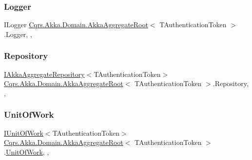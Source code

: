 \subsubsection{\texorpdfstring{Logger}{Logger}}
{\footnotesize\ttfamily I\+Logger \hyperlink{classCqrs_1_1Akka_1_1Domain_1_1AkkaAggregateRoot}{Cqrs.\+Akka.\+Domain.\+Akka\+Aggregate\+Root}$<$ T\+Authentication\+Token $>$.Logger\hspace{0.3cm}{\ttfamily [get]}, {\ttfamily [set]}, {\ttfamily [protected]}}

\mbox{\label{classCqrs_1_1Akka_1_1Domain_1_1AkkaAggregateRoot_ae15ae65ca994c5ab932d9817a9f7cb7d_ae15ae65ca994c5ab932d9817a9f7cb7d}} 
\subsubsection{\texorpdfstring{Repository}{Repository}}
{\footnotesize\ttfamily \hyperlink{interfaceCqrs_1_1Akka_1_1Domain_1_1IAkkaAggregateRepository}{I\+Akka\+Aggregate\+Repository}$<$T\+Authentication\+Token$>$ \hyperlink{classCqrs_1_1Akka_1_1Domain_1_1AkkaAggregateRoot}{Cqrs.\+Akka.\+Domain.\+Akka\+Aggregate\+Root}$<$ T\+Authentication\+Token $>$.Repository\hspace{0.3cm}{\ttfamily [get]}, {\ttfamily [set]}, {\ttfamily [protected]}}

\mbox{\label{classCqrs_1_1Akka_1_1Domain_1_1AkkaAggregateRoot_a58b79dc3e0d837e58d95f5cfeb2da9a1_a58b79dc3e0d837e58d95f5cfeb2da9a1}} 
\subsubsection{\texorpdfstring{Unit\+Of\+Work}{UnitOfWork}}
{\footnotesize\ttfamily \hyperlink{interfaceCqrs_1_1Domain_1_1IUnitOfWork}{I\+Unit\+Of\+Work}$<$T\+Authentication\+Token$>$ \hyperlink{classCqrs_1_1Akka_1_1Domain_1_1AkkaAggregateRoot}{Cqrs.\+Akka.\+Domain.\+Akka\+Aggregate\+Root}$<$ T\+Authentication\+Token $>$.\hyperlink{classCqrs_1_1Domain_1_1UnitOfWork}{Unit\+Of\+Work}\hspace{0.3cm}{\ttfamily [get]}, {\ttfamily [set]}, {\ttfamily [protected]}}

